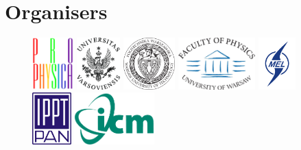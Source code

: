 \section*{Organisers}
\begin{figure}[H]%
\centering
	\includegraphics[height=2cm,keepaspectratio]{logo_organiz/prophys165x131px.pdf} \hfill
	\includegraphics[height=2cm,keepaspectratio]{logo_organiz/Logotyp_UW_lacina} \hfill
	\includegraphics[height=2cm,keepaspectratio]{logo_organiz/logo_Politechniki_Warszawskiej__NEW_POZYTYW_pol.pdf} \hfill
	\includegraphics[height=2cm,keepaspectratio]{logo_organiz/LogoFUW_en1199_810} \hfill
	\includegraphics[height=2cm,keepaspectratio]{logo_organiz/logo_meil.png} \hfill
	\includegraphics[height=2cm,keepaspectratio]{logo_organiz/oficjalne-logo-IPPT1200x1600} \hfill
	\includegraphics[height=2cm,keepaspectratio]{logo_organiz/logoICM} \hfill
\end{figure}


